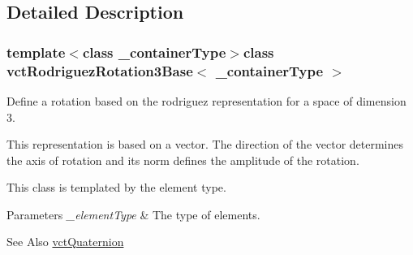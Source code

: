 \subsection{Detailed Description}
\subsubsection*{template$<$class \-\_\-container\-Type$>$class vct\-Rodriguez\-Rotation3\-Base$<$ \-\_\-container\-Type $>$}

Define a rotation based on the rodriguez representation for a space of dimension 3. 

This representation is based on a vector. The direction of the vector determines the axis of rotation and its norm defines the amplitude of the rotation.

This class is templated by the element type.


\begin{DoxyParams}{Parameters}
{\em \-\_\-element\-Type} & The type of elements.\\
\hline
\end{DoxyParams}
\begin{DoxySeeAlso}{See Also}
\hyperlink{classvct_quaternion}{vct\-Quaternion} 
\end{DoxySeeAlso}


